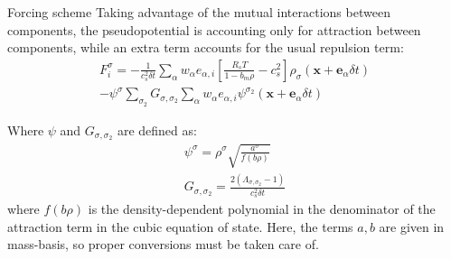 \documentclass[8pt]{beamer}
\newcommand{\locx}{\mathbf{x}}
\newcommand{\vele}{\mathbf{e}_\alpha}
\begin{document}
	\begin{frame}{Forcing scheme}
	Taking advantage of the mutual interactions between components, 
	the pseudopotential is accounting only for attraction between components, while an extra term accounts for the usual repulsion term:
	\begin{equation*}
	\begin{split}
	F_i^\sigma =  - \frac{1}{c_s^2 \delta t} \sum_\alpha  w_\alpha  e_{\alpha,i} [\frac{R_sT}{1-b_m \rho} - c_s^2 ] \rho_\sigma ( \locx + \vele \delta t) \\ - \psi^\sigma \sum_{\sigma_2} G_{\sigma,\sigma_2} \sum_\alpha w_\alpha e_{\alpha,i} \psi^{\sigma_2} ( \locx + \vele \delta t)  
	\end{split}
	\end{equation*}
	
	Where $\psi$ and $G_{\sigma,\sigma_2}$ are defined as:
	\begin{equation}
		\begin{split}
		\psi^\sigma = \rho^\sigma \sqrt{\frac{a^\sigma}{f(b\rho)}}\\
		G_{\sigma,\sigma_2} = \frac{2(\varLambda_{\sigma, \sigma_2}-1)}{c_s^2 \delta t} 
		\end{split}
	\end{equation}
	where $f(b\rho)$ is the density-dependent polynomial in the denominator of the attraction term in the cubic equation of state. Here, the terms $a,b$ are given in mass-basis, so proper conversions must be taken care of. 
	\end{frame}
\end{document}
